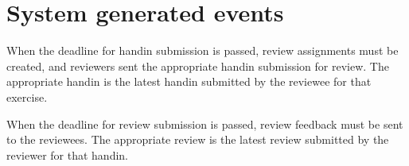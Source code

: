 \documentclass[Main]{subfiles}
\begin{document}
\section{System generated events}\label{sec:SysGenEvents}

\begin{EventTable}
\Record
{When the deadline for handin submission is passed, review assignments must be created, and reviewers sent the appropriate handin submission for review. The appropriate handin is the latest handin submitted by the reviewee for that exercise.}{}{}

\Record
{When the deadline for review submission is passed, review feedback must be sent to the reviewees. The appropriate review is the latest review submitted by the reviewer for that handin.}{}{}

\end{EventTable}
\end{document}
